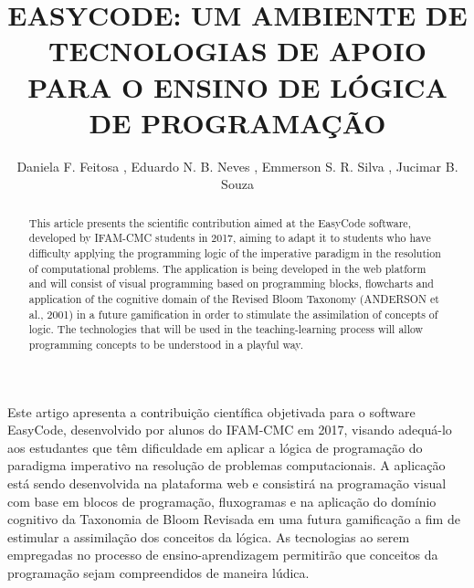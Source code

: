 \documentclass[12pt]{article}
\title{EASYCODE: UM AMBIENTE DE TECNOLOGIAS DE APOIO PARA O ENSINO DE LÓGICA DE PROGRAMAÇÃO}
\author{Daniela F. Feitosa \inst{1}, Eduardo N. B. Neves \inst{1}, Emmerson S. R. Silva \inst{1}, Jucimar B. Souza \inst{1}}
\begin{document}
 

\maketitle

\begin{abstract}
This article presents the scientific contribution aimed at the EasyCode software, developed by IFAM-CMC students in 2017, aiming to adapt it to students who have difficulty applying the programming logic of the imperative paradigm in the resolution of computational problems. The application is being developed in the web platform and will consist of visual programming based on programming blocks, flowcharts and application of the cognitive domain of the Revised Bloom Taxonomy (ANDERSON et al., 2001) in a future gamification in order to stimulate the assimilation of concepts of logic. The technologies that will be used in the teaching-learning process will allow programming concepts to be understood in a playful way.

\end{abstract}
     
\begin{resumo}
Este artigo apresenta a contribuição científica objetivada para o software EasyCode, desenvolvido por alunos do IFAM-CMC em 2017, visando adequá-lo aos estudantes que têm dificuldade em aplicar a lógica de programação do paradigma imperativo na resolução de problemas computacionais. A aplicação está sendo desenvolvida na plataforma web e consistirá na programação visual com base em blocos de programação, fluxogramas e na aplicação do domínio cognitivo da Taxonomia de Bloom Revisada \cite{ANDERSON:2001} em uma futura gamificação a fim de estimular a assimilação dos conceitos da lógica. As tecnologias ao serem empregadas no processo de ensino-aprendizagem permitirão que conceitos da programação sejam compreendidos de maneira lúdica.
\end{resumo}
\end{document}
